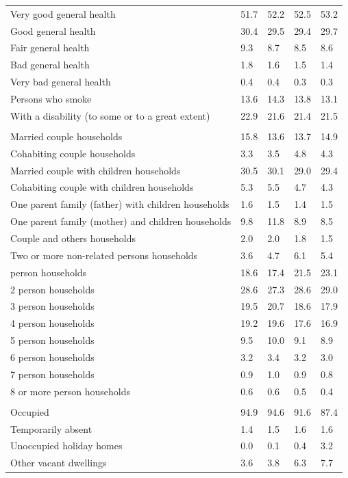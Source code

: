 \documentclass{article}
\begin{document}
\begin{table}[h]
\begin{tabular}{KTTTT}
    \hline
Very good general health & 51.7& 52.2&52.5& 53.2\\
Good general health & 30.4& 29.5& 29.4& 29.7\\
Fair general health & 9.3& 8.7&8.5& 8.6\\
Bad general health & 1.8& 1.6&1.5& 1.4\\
Very bad general health & 0.4& 0.4&0.3& 0.3\\
    \hline
Persons who smoke & 13.6& 14.3&13.8& 13.1\\
    \hline
With a disability (to some or to a great extent) & 22.9& 21.6&21.4& 21.5\\
\hline
    \\ 
    \hline
Married couple households & 15.8& 13.6& 13.7& 14.9\\
Cohabiting couple households & 3.3& 3.5& 4.8& 4.3\\
Married couple with children households & 30.5& 30.1& 29.0& 29.4\\
Cohabiting couple with children households & 5.3& 5.5& 4.7& 4.3\\
One parent family (father) with  children households & 1.6& 1.5& 1.4& 1.5\\
One parent family (mother) and children households &  9.8& 11.8&  8.9&  8.5\\
Couple and others households  & 2.0& 2.0& 1.8& 1.5\\
Two or more non-related persons households & 3.6& 4.7& 6.1& 5.4\\
     person households & 18.6& 17.4& 21.5& 23.1\\
2 person households & 28.6& 27.3& 28.6& 29.0\\
3 person households & 19.5& 20.7& 18.6& 17.9\\
4 person households & 19.2& 19.6& 17.6& 16.9\\
5 person households &  9.5& 10.0&  9.1&  8.9\\
6 person households & 3.2& 3.4& 3.2& 3.0\\
7 person households & 0.9& 1.0& 0.9& 0.8\\
8 or more person households & 0.6& 0.6& 0.5& 0.4\\
\hline
    \\ 
    \hline
Occupied & 94.9& 94.6& 91.6& 87.4\\
Temporarily absent & 1.4& 1.5& 1.6& 1.6\\
Unoccupied holiday homes & 0.0& 0.1& 0.4& 3.2\\
Other vacant dwellings & 3.6& 3.8& 6.3& 7.7\\
\hline
\end{tabular}
\end{table}
\end{document}
